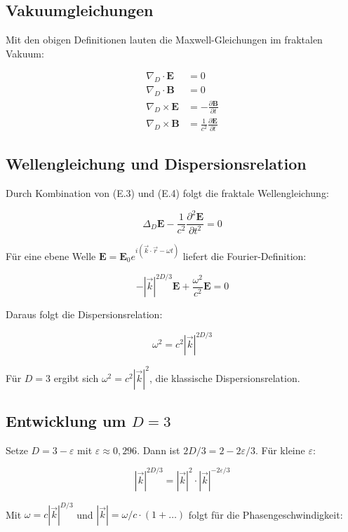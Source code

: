 \subsection{Vakuumgleichungen}

Mit den obigen Definitionen lauten die Maxwell-Gleichungen im fraktalen Vakuum:

\begin{align}
\nabla_D \cdot \mathbf{E} &= 0 \tag{E.1} \\
\nabla_D \cdot \mathbf{B} &= 0 \tag{E.2} \\
\nabla_D \times \mathbf{E} &= -\frac{\partial \mathbf{B}}{\partial t} \tag{E.3} \\
\nabla_D \times \mathbf{B} &= \frac{1}{c^2} \frac{\partial \mathbf{E}}{\partial t} \tag{E.4}
\end{align}

\subsection{Wellengleichung und Dispersionsrelation}

Durch Kombination von (E.3) und (E.4) folgt die fraktale Wellengleichung:

\[
\Delta_D \mathbf{E} - \frac{1}{c^2} \frac{\partial^2 \mathbf{E}}{\partial t^2} = 0 \tag{E.5}
\]

Für eine ebene Welle \( \mathbf{E} = \mathbf{E}_0 e^{i(\vec{k}\cdot\vec{r} - \omega t)} \) 
liefert die Fourier-Definition:

\[
-|\vec{k}|^{2D/3} \mathbf{E} + \frac{\omega^2}{c^2} \mathbf{E} = 0
\]

Daraus folgt die Dispersionsrelation:

\[
\omega^2 = c^2 |\vec{k}|^{2D/3} \tag{E.6}
\]

Für \( D = 3 \) ergibt sich \( \omega^2 = c^2 |\vec{k}|^2 \), die klassische Dispersionsrelation.

\subsection{Entwicklung um \( D = 3 \)}

Setze \( D = 3 - \varepsilon \) mit \( \varepsilon \approx 0,296 \). Dann ist 
\( 2D/3 = 2 - 2\varepsilon/3 \). Für kleine \( \varepsilon \):

\[
|\vec{k}|^{2D/3} = |\vec{k}|^2 \cdot |\vec{k}|^{-2\varepsilon/3}
\]

Mit \( \omega = c |\vec{k}|^{D/3} \) und \( |\vec{k}| = \omega/c \cdot (1 + \ldots) \) folgt
für die Phasengeschwindigkeit:

